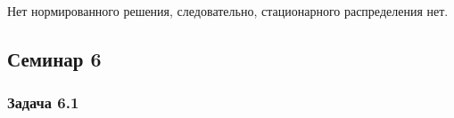 \[
	\begin{aligned}
	\end{aligned}
\]

Нет нормированного решения, следовательно, стационарного распределения нет.


\subsection{Семинар 6}

\subsubsection*{Задача 6.1}
